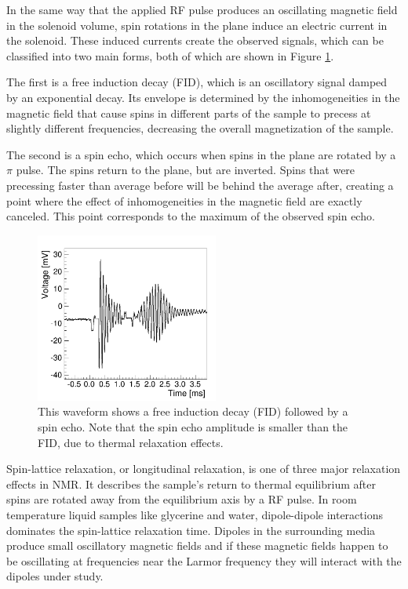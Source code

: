 In the same way that the applied RF pulse produces an oscillating magnetic field in the solenoid volume, spin rotations in the plane induce an electric current in the solenoid. These induced currents create the observed signals, which can be classified into two main forms, both of which are shown in Figure \ref{fig:fidecho}.

The first is a free induction decay (FID), which is an oscillatory signal damped by an exponential decay. Its envelope is determined by the inhomogeneities in the magnetic field that cause spins in different parts of the sample to precess at slightly different frequencies, decreasing the overall magnetization of the sample.

The second is a spin echo, which occurs when spins in the plane are rotated by a $\pi$ pulse. The spins return to the plane, but are inverted. Spins that were precessing faster than average before will be behind the average after, creating a point where the effect of inhomogeneities in the magnetic field are exactly canceled. This point corresponds to the maximum of the observed spin echo.

\begin{figure}[htb]
\includegraphics[width=6cm]{water_n2/fidecho.png}
\caption{This waveform shows a free induction decay (FID) followed by a spin echo. Note that the spin echo amplitude is smaller than the FID, due to thermal relaxation effects.}
\label{fig:fidecho}
\end{figure}

Spin-lattice relaxation, or longitudinal relaxation, is one of three major relaxation effects in NMR. It describes the sample's return to thermal equilibrium after spins are rotated away from the equilibrium axis by a RF pulse. In room temperature liquid samples like glycerine and water, dipole-dipole interactions dominates the spin-lattice relaxation time\cite{ray}. Dipoles in the surrounding media produce small oscillatory magnetic fields and if these magnetic fields happen to be oscillating at frequencies near the Larmor frequency they will interact with the dipoles under study.

